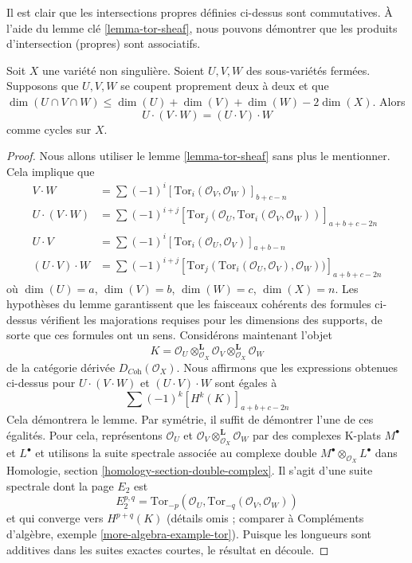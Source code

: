 \noindent
Il est clair que les intersections propres définies ci-dessus sont commutatives.
À l'aide du lemme clé \ref{lemma-tor-sheaf}, nous pouvons démontrer que les produits
d'intersection (propres) sont associatifs.

\begin{lemma}
\label{lemma-associative}
Soit $X$ une variété non singulière. Soient $U, V, W$ des sous-variétés
fermées. Supposons que $U, V, W$ se coupent proprement deux à deux
et que $\dim(U \cap V \cap W) \leq \dim(U) + \dim(V) + \dim(W) - 2\dim(X)$.
Alors
$$
U \cdot (V \cdot W) = (U \cdot V) \cdot W
$$
comme cycles sur $X$.
\end{lemma}

\begin{proof}
Nous allons utiliser le lemme \ref{lemma-tor-sheaf} sans plus le mentionner.
Cela implique que
\begin{align*}
V \cdot W
& =
\sum (-1)^i [\text{Tor}_i(\mathcal{O}_V, \mathcal{O}_W)]_{b + c - n} \\
U \cdot (V \cdot W)
& =
\sum (-1)^{i + j}
[
\text{Tor}_j(\mathcal{O}_U, \text{Tor}_i(\mathcal{O}_V, \mathcal{O}_W))
]_{a + b + c - 2n} \\
U \cdot V
& =
\sum (-1)^i [\text{Tor}_i(\mathcal{O}_U, \mathcal{O}_V)]_{a + b - n} \\
(U \cdot V) \cdot W
& =
\sum (-1)^{i + j}
[
\text{Tor}_j(\text{Tor}_i(\mathcal{O}_U, \mathcal{O}_V), \mathcal{O}_W))
]_{a + b + c - 2n}
\end{align*}
où $\dim(U) = a$, $\dim(V) = b$, $\dim(W) = c$, $\dim(X) = n$.
Les hypothèses du lemme garantissent que les faisceaux cohérents
des formules ci-dessus vérifient les majorations requises pour les dimensions
des supports, de sorte que ces formules ont un sens. Considérons maintenant l'objet
$$
K =
\mathcal{O}_U \otimes^\mathbf{L}_{\mathcal{O}_X} \mathcal{O}_V
\otimes^\mathbf{L}_{\mathcal{O}_X} \mathcal{O}_W
$$
de la catégorie dérivée $D_{\textit{Coh}}(\mathcal{O}_X)$.
Nous affirmons que les expressions obtenues ci-dessus pour
$U \cdot (V \cdot W)$ et $(U \cdot V) \cdot W$
sont égales à
$$
\sum (-1)^k [H^k(K)]_{a + b + c - 2n}
$$
Cela démontrera le lemme. Par symétrie, il suffit de démontrer l'une
de ces égalités. Pour cela, représentons $\mathcal{O}_U$
et $\mathcal{O}_V \otimes_{\mathcal{O}_X}^\mathbf{L} \mathcal{O}_W$
par des complexes K-plats $M^\bullet$ et $L^\bullet$ et utilisons la
suite spectrale associée au complexe double
$M^\bullet \otimes_{\mathcal{O}_X} L^\bullet$ dans
Homologie, section \ref{homology-section-double-complex}.
Il s'agit d'une suite spectrale dont la page $E_2$ est
$$
E_2^{p, q} =
\text{Tor}_{-p}(\mathcal{O}_U, \text{Tor}_{-q}(\mathcal{O}_V, \mathcal{O}_W))
$$
et qui converge vers $H^{p + q}(K)$ (détails omis ; comparer à
Compléments d'algèbre, exemple \ref{more-algebra-example-tor}).
Puisque les longueurs sont additives dans les suites
exactes courtes, le résultat en découle.
\end{proof}




